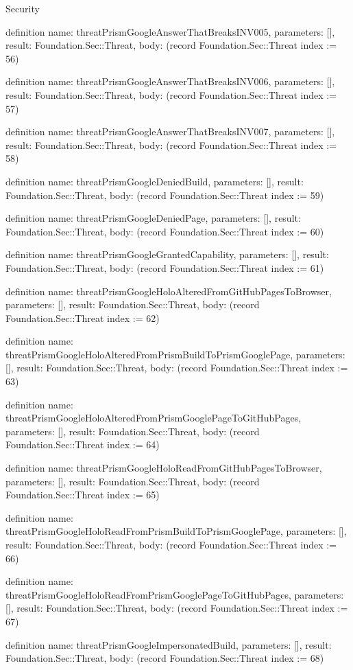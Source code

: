 \begin{lexlean}{Security}
\begin{semanticmodule}
definition{
  name: threatPrismGoogleAnswerThatBreaksINV005,
  parameters: [],
  result: Foundation.Sec::Threat,
  body: (record Foundation.Sec::Threat {index := 56})
}

definition{
  name: threatPrismGoogleAnswerThatBreaksINV006,
  parameters: [],
  result: Foundation.Sec::Threat,
  body: (record Foundation.Sec::Threat {index := 57})
}

definition{
  name: threatPrismGoogleAnswerThatBreaksINV007,
  parameters: [],
  result: Foundation.Sec::Threat,
  body: (record Foundation.Sec::Threat {index := 58})
}

definition{
  name: threatPrismGoogleDeniedBuild,
  parameters: [],
  result: Foundation.Sec::Threat,
  body: (record Foundation.Sec::Threat {index := 59})
}

definition{
  name: threatPrismGoogleDeniedPage,
  parameters: [],
  result: Foundation.Sec::Threat,
  body: (record Foundation.Sec::Threat {index := 60})
}

definition{
  name: threatPrismGoogleGrantedCapability,
  parameters: [],
  result: Foundation.Sec::Threat,
  body: (record Foundation.Sec::Threat {index := 61})
}

definition{
  name: threatPrismGoogleHoloAlteredFromGitHubPagesToBrowser,
  parameters: [],
  result: Foundation.Sec::Threat,
  body: (record Foundation.Sec::Threat {index := 62})
}

definition{
  name: threatPrismGoogleHoloAlteredFromPrismBuildToPrismGooglePage,
  parameters: [],
  result: Foundation.Sec::Threat,
  body: (record Foundation.Sec::Threat {index := 63})
}

definition{
  name: threatPrismGoogleHoloAlteredFromPrismGooglePageToGitHubPages,
  parameters: [],
  result: Foundation.Sec::Threat,
  body: (record Foundation.Sec::Threat {index := 64})
}

definition{
  name: threatPrismGoogleHoloReadFromGitHubPagesToBrowser,
  parameters: [],
  result: Foundation.Sec::Threat,
  body: (record Foundation.Sec::Threat {index := 65})
}

definition{
  name: threatPrismGoogleHoloReadFromPrismBuildToPrismGooglePage,
  parameters: [],
  result: Foundation.Sec::Threat,
  body: (record Foundation.Sec::Threat {index := 66})
}

definition{
  name: threatPrismGoogleHoloReadFromPrismGooglePageToGitHubPages,
  parameters: [],
  result: Foundation.Sec::Threat,
  body: (record Foundation.Sec::Threat {index := 67})
}

definition{
  name: threatPrismGoogleImpersonatedBuild,
  parameters: [],
  result: Foundation.Sec::Threat,
  body: (record Foundation.Sec::Threat {index := 68})
}


\end{semanticmodule}
\end{lexlean}
